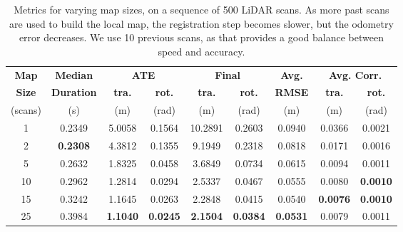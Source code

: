 \begin{table}[h]
    \centering
    {\small
        \begin{tabular}{c|c|cc|cc|c|cc}
            \hline
            \textbf{Map}  & \textbf{Median}   & \multicolumn{2}{c|}{ \textbf{ATE}} & \multicolumn{2}{c|}{ \textbf{Final}} & \textbf{Avg.}   & \multicolumn{2}{c}{ \textbf{Avg. Corr.}}                                                       \\
            \textbf{Size} & \textbf{Duration} & \textbf{tra.}                      & \textbf{rot.}                        & \textbf{tra.}   & \textbf{rot.}                            & \textbf{RMSE}   & \textbf{tra.}   & \textbf{rot.}   \\
            (scans)       & (s)               & (m)                                & (rad)                                & (m)             & (rad)                                    & (m)             & (m)             & (rad)           \\
            \hline
            \hline

            1             & 0.2349            & 5.0058                             & 0.1564                               & 10.2891         & 0.2603                                   & 0.0940          & 0.0366          & 0.0021          \\
            2             & \textbf{0.2308}   & 4.3812                             & 0.1355                               & 9.1949          & 0.2318                                   & 0.0818          & 0.0171          & 0.0016          \\
            5             & 0.2632            & 1.8325                             & 0.0458                               & 3.6849          & 0.0734                                   & 0.0615          & 0.0094          & 0.0011          \\
            10            & 0.2962            & 1.2814                             & 0.0294                               & 2.5337          & 0.0467                                   & 0.0555          & 0.0080          & \textbf{0.0010} \\
            15            & 0.3242            & 1.1645                             & 0.0263                               & 2.2848          & 0.0415                                   & 0.0540          & \textbf{0.0076} & \textbf{0.0010} \\
            25            & 0.3984            & \textbf{1.1040}                    & \textbf{0.0245}                      & \textbf{2.1504} & \textbf{0.0384}                          & \textbf{0.0531} & 0.0079          & 0.0011          \\
            \hline
        \end{tabular}
    }
    \caption{Metrics for varying map sizes, on a sequence of 500 LiDAR scans. As more past scans are used to build the local map, the registration step becomes slower, but the odometry error decreases. We use 10 previous scans, as that provides a good balance between speed and accuracy.}
    \label{tab:map_sizes}
\end{table}

